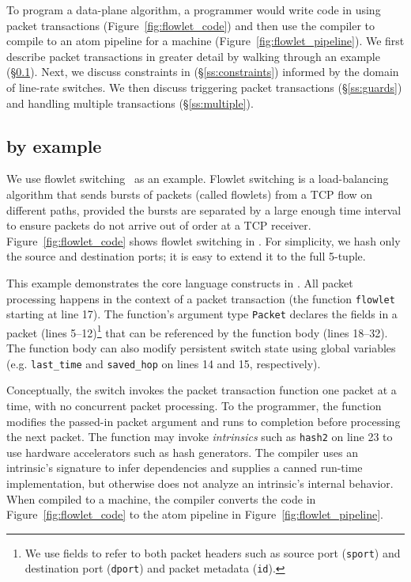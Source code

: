 To program a data-plane algorithm, a programmer would write code in
\pktlanguage using packet transactions (Figure~\ref{fig:flowlet_code})
and then use the \pktlanguage compiler to compile to an atom pipeline
for a \absmachine machine (Figure~\ref{fig:flowlet_pipeline}). We
first describe packet transactions in greater detail by walking
through an example (\S\ref{ss:flowlet}). Next, we discuss constraints
in \pktlanguage (\S\ref{ss:constraints}) informed by the domain of
line-rate switches. We then discuss triggering packet transactions
(\S\ref{ss:guards}) and handling multiple transactions
(\S\ref{ss:multiple}).

\subsection{\pktlanguage by example}
\label{ss:flowlet}

We use flowlet switching~\cite{flowlets} as an example. Flowlet
switching is a load-balancing algorithm that sends bursts of packets
(called flowlets) from a TCP flow on different paths, provided the
bursts are separated by a large enough time interval to ensure packets
do not arrive out of order at a TCP
receiver. Figure~\ref{fig:flowlet_code} shows flowlet switching in
\pktlanguage. For simplicity, we hash only the source and destination
ports; it is easy to extend it to the full 5-tuple.

This example demonstrates the core language constructs in
\pktlanguage. All packet processing happens in the context of a packet
transaction (the function \texttt{flowlet} starting at line 17). The
function's argument type {\tt Packet} declares the fields in a packet (lines
5--12)\footnote{We use fields to refer to both packet headers such as
  source port ({\tt sport}) and destination port ({\tt dport}) and
  packet metadata ({\tt id}).} that can be referenced by the function
body (lines 18--32).  The function body can also modify persistent
switch state using global variables (e.g.  \texttt{last\_time} and
\texttt{saved\_hop} on lines 14 and 15, respectively).

Conceptually, the switch invokes the packet transaction function one packet at
a time, with no concurrent packet processing. To the programmer, the function
modifies the passed-in packet argument and runs to completion before processing
the next packet.  The function may invoke \textit{intrinsics} such as
\texttt{hash2} on line 23 to use hardware accelerators such as hash generators.
The \pktlanguage compiler uses an intrinsic's signature to infer dependencies
and supplies a canned run-time implementation, but otherwise does not analyze
an intrinsic's internal behavior. When compiled to a \absmachine machine, the
compiler converts the code in Figure~\ref{fig:flowlet_code} to the atom
pipeline in Figure~\ref{fig:flowlet_pipeline}.

